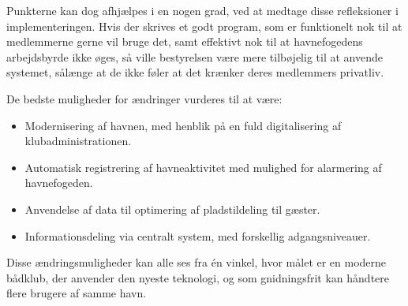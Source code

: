 Punkterne kan dog afhjælpes i en nogen grad, ved at medtage disse refleksioner i implementeringen. Hvis der skrives et godt program, som er funktionelt nok til at medlemmerne gerne vil bruge det, samt effektivt nok til at havnefogedens arbejdsbyrde ikke øges, så ville bestyrelsen være mere tilbøjelig til at anvende systemet, sålænge at de ikke føler at det krænker deres medlemmers privatliv.

De bedste muligheder for ændringer vurderes til at være:

\begin{itemize}
  \item Modernisering af havnen, med henblik på en fuld digitalisering af klubadministrationen.
  \item Automatisk registrering af havneaktivitet med mulighed for alarmering af havnefogeden.
  \item Anvendelse af data til optimering af pladstildeling til gæster.
  \item Informationsdeling via centralt system, med forskellig adgangsniveauer.
\end{itemize}

Disse ændringsmuligheder kan alle ses fra én vinkel, hvor målet er en moderne bådklub, der anvender den nyeste teknologi, og som gnidningsfrit kan håndtere flere brugere af samme havn.
